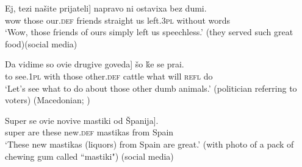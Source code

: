 \documentclass[output=paper,
colorlinks,
citecolor=brown,
newtxmath
]{langscibook}
\begin{document}
\ex \label{speechless}
\gll Ej, 	\minsp{[} tezi 	našite	prijateli] 	napravo 	ni 	ostavixa 	bez 	dumi.\\
wow 	{} those 	our.\textsc{def} friends straight 	us 	left.\textsc{3pl} 	without 	words\\
\glt `Wow, those friends of ours simply left us speechless.' (they served such great food)\hfill (social media)
\z
\z





\ea \label{Mmedia}
\ea \label{cattle}
\gll Da 	vidime 	so 	\minsp{[} ovie 	drugive 	goveda] 	šo 	ḱe	se 	prai.\\
    to 	see.\textsc{1pl} 	with 	 {} those 	other.\textsc{def}	cattle 	what 	will 	\textsc{refl} 	do\\
    \glt ‘Let’s see what to do about those other dumb animals.’ (politician referring to voters) \hfill (Macedonian; \citealt{Prizma2015})

    \ex \label{mastika}
    \gll Super 	se 	\minsp{[} ovie 	novive 	mastiki 	od 	Španija].\\
    super 	are 	 {} these 	new.\textsc{def} 	mastikas 	from 	Spain\\
    \glt ‘These new mastikas (liquors) from Spain are great.’ (with photo of a pack of chewing gum called ``mastiki") \hfill (social media)
    \z
    \z
\end{document}
